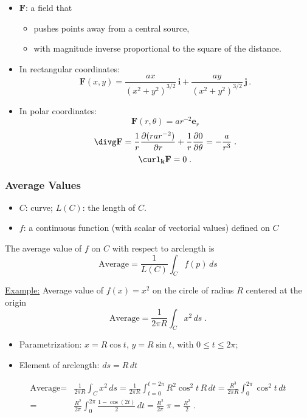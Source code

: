 \begin{frame}
   \begin{itemize}
     \item $\textbf{F}$: a field that
     \begin{itemize}
       \item pushes points away from a central source,
       \item with magnitude inverse proportional to the square of the distance.
     \end{itemize}

     \item \pause In rectangular coordinates:
%
$$\textbf{F}(x,y) = \frac{ax}{(x^2+y^2)^{3/2}}\, \textbf{i} + \frac{ay}{(x^2+y^2)^{3/2}} \, \textbf{j}\, .$$
%
\item \pause In polar coordinates:
%
$$\textbf{F}(r,\theta) = ar^{-2} \textbf{e}_r$$
%
$$\divg \textbf{F} = \frac{1}{r} \frac{\partial (r a r^{-2})}{\partial r} + \frac{1}{r} \frac{\partial 0}{\partial \theta} = -\frac{a}{r^3}\; .$$
%
$$\curl_{\textbf{k}} \textbf{F} = 0\; .$$
   \end{itemize}

\end{frame}

\begin{frame}
  \frametitle{Average Values}

\begin{itemize}
\item $C$:  curve; $L(C)$: the length of $C$.
\item $f$: a continuous function (with scalar of vectorial values) defined on $C$
\end{itemize}

The average value of $f$ on $C$ with respect to arclength is
%
$$\text{Average} = \frac{1}{L(C)} \int_C f(p)\,  ds$$
%

\underline{Example:} Average value of $f(x) = x^2$ on the circle of radius $R$ centered at the origin 
%
$$\text{Average} = \frac{1}{2\pi R} \int_C x^2 \, ds \; .$$
%
\pause
%
\begin{itemize}
\item Parametrization:  $x=R\cos{t}$, $y=R\sin{t}$, with $0 \leqslant t \leqslant 2\pi$;
\item Element of arclength: $ds = R\, dt$
\end{itemize}
\begin{align*}
  \text{Average} = & \frac{1}{2\pi R} \int_C x^2 \, ds = \frac{1}{2\pi R} \int_{t=0}^{t=2\pi} R^2\cos^2{t}\,  R \, dt = \frac{R^3}{2\pi R} \int_0^{2\pi} \cos^2{t}\, dt \\
  = & \frac{R^2}{2\pi} \int_0^{2\pi} \frac{1-\cos{(2t)}}{2}\, dt = \frac{R^2}{2\pi} \; \pi = \frac{R^2}{2}\; .
\end{align*}
\end{frame}

